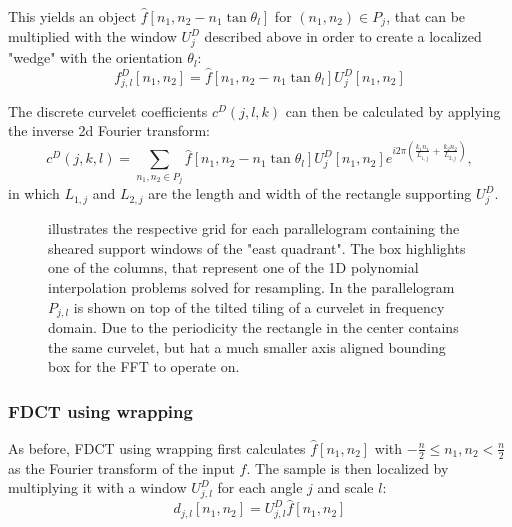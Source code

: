 This yields an object $\hat{f}[n_1, n_2 - n_1 \tan \theta_l]$ for $(n_1, n_2)
\in P_j$, that can be multiplied with the window $U_j^D$ described above in
order to create a localized "wedge" with the orientation $\theta_l$:
\begin{equation*}
    f_{j, l}^D[n_1, n_2] = \hat{f}[n_1, n_2 - n_1 \tan \theta_l] U_j^D[n_1, n_2]
\end{equation*}

The discrete curvelet coefficients $c^D(j, l, k)$ can then be calculated by
applying the inverse 2d Fourier transform:
\begin{equation*}
    c^D(j, k, l) = \sum_{n_1, n_2 \in P_j} \hat{f}[n_1, n_2 - n_1 \tan \theta_l] U_j^D[n_1, n_2] e^{i 2 \pi (\frac{k_1 n_1}{L_{1, j}} + \frac{k_2 n_2}{L_{2,j}})},
\end{equation*}
in which $L_{1, j}$ and $L_{2, j}$ are the length and width of the rectangle supporting $U_j^D$.

\begin{figure}[h]
    \centering
    \quad
    \caption[Frequency tilings for USFFT and wrapping]{
         illustrates the respective grid for
        each parallelogram containing the sheared support windows of the "east
        quadrant". The box highlights one of the columns, that represent one of
        the 1D polynomial interpolation problems solved for resampling.
        In  the parallelogram $P_{j ,l}$
        is shown on top of the tilted tiling of a curvelet in frequency domain.
        Due to the periodicity the rectangle in the center contains the same
        curvelet, but hat a much smaller axis aligned bounding box for the FFT
        to operate on.
    }
    \label{fig:curvelet_discrete_tilings}
\end{figure}

\subsubsection{FDCT using wrapping}

As before, FDCT using wrapping first calculates $\hat{f}[n_1, n_2]$ with
$-\frac{n}{2} \leq n_1, n_2 < \frac{n}{2}$ as the Fourier transform of the
input $f$. The sample is then localized by multiplying it with a window $U_{j,
l}^D$ for each angle $j$ and scale $l$:
\begin{equation*}
    d_{j, l}[n_1, n_2] = U_{j, l}^D \hat{f}[n_1, n_2]
\end{equation*}

